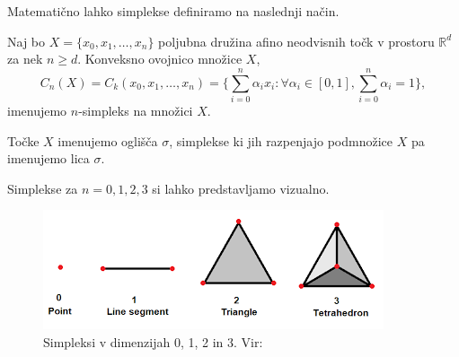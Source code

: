 Matematično lahko simplekse definiramo na naslednji način.
\begin{definicija}
Naj bo \(X = \{x_0, x_1, \dots, x_n\}\) poljubna družina afino neodvisnih točk v prostoru \(\mathbb{R}^d\) za nek \(n \geq d\). Konveksno ovojnico množice \(X\),
\[
C_n(X) = C_k(x_0, x_1, \dots, x_n) = \{\sum_{i=0}^n \alpha_i x_i : \forall \alpha_i \in [0, 1], \sum_{i=0}^n \alpha_i = 1\},
\]
imenujemo \(n\)-simpleks na množici \(X\).
\end{definicija}
Točke \(X\) imenujemo oglišča \(\sigma\), simplekse ki jih razpenjajo podmnožice \(X\) pa imenujemo lica \(\sigma\).

Simplekse za $n = 0, 1, 2, 3$ si lahko predstavljamo vizualno.

\begin{figure}[H]
    \centering
    \includegraphics{resources/simplex.png}
    \caption{Simpleksi v dimenzijah 0, 1, 2 in 3. Vir: \cite{schneider_simplexes}}
    \label{fig:enter-label}
\end{figure}

